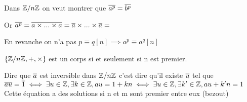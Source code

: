 \documentclass[a4paper, 12pt]{article}
\begin{document}
\begin{demonstration}
    Dans $\mathbb{Z}/n\mathbb{Z}$ on veut montrer que $\overline{a^p} = \overline{b^p}$

    Or $\overline{a^p} = \overline{a \times ... \times a} = \overline{a} \times ... \times \overline{a} =$
\end{demonstration}

\begin{remark}
    En revanche on n'a pas $p \equiv q [n] \implies a^p \equiv a^q [n]$
\end{remark}

\begin{theorem}
    $\{\mathbb{Z}/n\mathbb{Z}, +, \times\}$ est un corps si et seulement si n est premier.
\end{theorem}

\begin{demonstration}
    Dire que $\overline{a}$ est inversible dans $\mathbb{Z}/n\mathbb{Z}$ c'est dire
    qu'il existe $\overline{u}$ tel que $\overline{a}\overline{u} = \overline{1} \iff \exists u \in \mathbb{Z}, \exists k \in \mathbb{Z}, au = 1 + kn \iff \exists u \in \mathbb{Z}, \exists k' \in \mathbb{Z}, au + k'n = 1$
    Cette équation a des solutions si n et m sont premier entre eux (bezout)
\end{demonstration}
\end{document}
